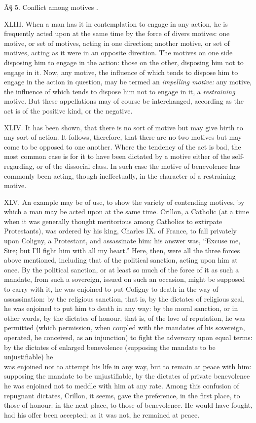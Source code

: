\documentclass[12pt]{report}
\begin{document}
Â§ 5. Conflict among motives .

XLIII. When a man has it in contemplation to engage in any action, he is
frequently acted upon at the same time by the force of divers motives:
one motive, or set of motives, acting in one direction; another motive,
or set of motives, acting as it were in an opposite direction. The
motives on one side disposing him to engage in the action: those on the
other, disposing him not to engage in it. Now, any motive, the influence
of which tends to dispose him to engage in the action in question, may
be termed an \emph{impelling motive:} any motive, the influence of which
tends to dispose him not to engage in it, a \emph{restraining} motive.
But these appellations may of course be interchanged, according as the
act is of the positive kind, or the negative.

XLIV. It has been shown, that there is no sort of motive but may give
birth to any sort of action. It follows, therefore, that there are no
two motives but may come to be opposed to one another. Where the
tendency of the act is bad, the most common case is for it to have been
dictated by a motive either of the self-regarding, or of the dissocial
class. In such case the motive of benevolence has commonly been acting,
though ineffectually, in the character of a restraining motive.

XLV. An example may be of use, to show the variety of contending
motives, by which a man may be acted upon at the same time. Crillon, a
Catholic (at a time when it was generally thought meritorious among
Catholics to extirpate Protestants), was ordered by his king, Charles
IX. of France, to fall privately upon Coligny, a Protestant, and
assassinate him: his answer was, ``Excuse me, Sire; but I'll fight him
with all my heart.'' Here, then, were all the three forces above
mentioned, including that of the political sanction, acting upon him at
once. By the political sanction, or at least so much of the force of it
as such a mandate, from such a sovereign, issued on such an occasion,
might be supposed to carry with it, he was enjoined to put Coligny to
death in the way of assassination: by the religious sanction, that is,
by the dictates of religious zeal, he was enjoined to put him to death
in any way: by the moral sanction, or in other words, by the dictates of
honour, that is, of the love of reputation, he was permitted (which
permission, when coupled with the mandates of his sovereign, operated,
he conceived, as an injunction) to fight the adversary upon equal terms:
by the dictates of enlarged benevolence (supposing the mandate to be
unjustifiable) he\\
was enjoined not to attempt his life in any way, but to remain at peace
with him: supposing the mandate to be unjustifiable, by the dictates of
private benevolence he was enjoined not to meddle with him at any rate.
Among this confusion of repugnant dictates, Crillon, it seems, gave the
preference, in the first place, to those of honour: in the next place,
to those of benevolence. He would have fought, had his offer been
accepted; as it was not, he remained at peace.
\end{document}
